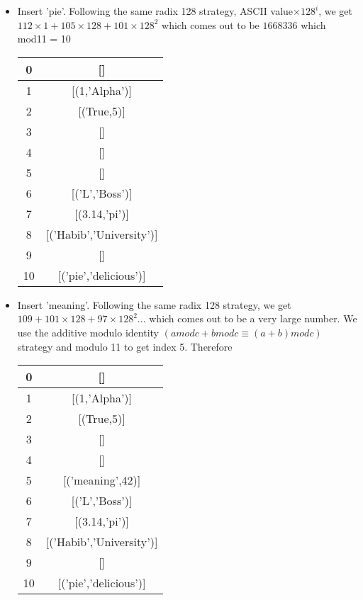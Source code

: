 \documentclass{article}
\begin{document}
\begin{enumerate}
\begin{itemize}
				\item Insert 'pie'. Following the same radix 128 strategy, ASCII value$\times 128^i$, we get $112\times 1 + 105 \times 128 + 101\times 128^2$ which comes out to be $1668336$ which mod11 = 10
				\begin{center}
					\begin{tabular}{ |c|c| } 
						\hline
						0 & []   \\ 
						\hline
						1 &	[(1,'Alpha')] \\
						\hline 
						2 & [(True,5)]  \\ 
						\hline
						3&[]\\
						\hline
						4&[]\\
						\hline
						5&[]\\
						\hline
						6&[('L','Boss')]\\
						\hline
						7&[(3.14,'pi')]\\
						\hline
						8&[('Habib','University')]\\
						\hline
						9&[]\\
						\hline
						10&[('pie','delicious')]\\
						\hline
					\end{tabular}
				\end{center}				
				\item Insert 'meaning'. Following the same radix 128 strategy, we get $109+101\times 128 + 97\times 128^2 ...$ which comes out to be a very large number. We use the additive modulo identity $(amodc +bmodc \equiv (a+b)modc)$ strategy and modulo 11 to get index 5. Therefore
				\begin{center}
					\begin{tabular}{ |c|c| } 
						\hline
						0 & []   \\ 
						\hline
						1 &	[(1,'Alpha')] \\
						\hline 
						2 & [(True,5)]  \\ 
						\hline
						3&[]\\
						\hline
						4&[]\\
						\hline
						5&[('meaning',42)]\\
						\hline
						6&[('L','Boss')]\\
						\hline
						7&[(3.14,'pi')]\\
						\hline
						8&[('Habib','University')]\\
						\hline
						9&[]\\
						\hline
						10&[('pie','delicious')]\\

\end{tabular}
\end{center}
\end{itemize}
\end{enumerate}
\end{document}
